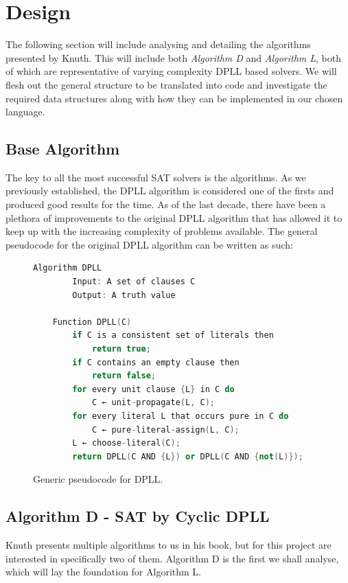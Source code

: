 \documentclass{article}
\begin{document}
\section{Design}
The following section will include analysing and detailing the algorithms presented by Knuth. This will include both
\textit{Algorithm D} and \textit{Algorithm L}, both of which are representative of varying complexity DPLL based solvers. We will
flesh out the general structure to be translated into code and investigate the required data structures along with how they can be
implemented in our chosen language.

\subsection{Base Algorithm}
The key to all the most successful SAT solvers is the algorithms. As we previously established, the DPLL algorithm is considered
one of the firsts and produced good results for the time. As of the last decade, there have been a plethora of improvements to the
original DPLL algorithm that has allowed it to keep up with the increasing complexity of problems available. The general
pseudocode for the original DPLL algorithm can be written as such:

\begin{figure}[h]
    \centering
    \begin{lstlisting}[language=C++]
    Algorithm DPLL
        Input: A set of clauses C
        Output: A truth value

    Function DPLL(C)
        if C is a consistent set of literals then
            return true;
        if C contains an empty clause then
            return false;
        for every unit clause {L} in C do
            C ← unit-propagate(L, C);
        for every literal L that occurs pure in C do
            C ← pure-literal-assign(L, C);
        L ← choose-literal(C);
        return DPLL(C AND {L}) or DPLL(C AND {not(L)});
    \end{lstlisting}
    \caption{Generic pseudocode for DPLL.}
\end{figure}

\subsection{Algorithm D - SAT by Cyclic DPLL}
Knuth presents multiple algorithms to us in his book, but for this project are interested in specifically two of them. Algorithm D
is the first we shall analyse, which will lay the foundation for Algorithm L.
\end{document}

